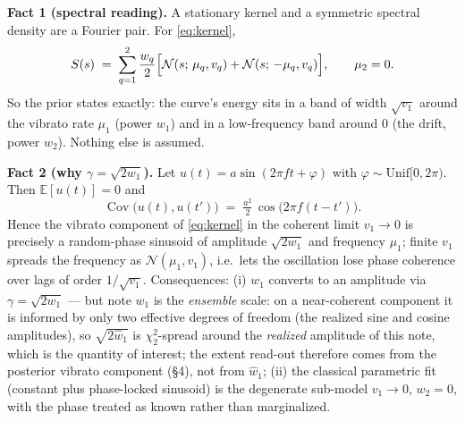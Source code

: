 \documentclass[10pt,a4paper]{article}
\newcommand{\N}{\mathcal{N}}
\begin{document}
\textbf{Fact 1 (spectral reading).}
A stationary kernel and a symmetric spectral density are a Fourier pair.
For \eqref{eq:kernel},
\begin{equation}
S(s) \;=\; \sum_{q=1}^{2} \frac{w_q}{2}
\Bigl[ \N(s;\, \mu_q, v_q) + \N(s;\, -\mu_q, v_q) \Bigr],
\qquad \mu_2 = 0 .
\end{equation}
So the prior states exactly: the curve's energy sits in a band of width
$\sqrt{v_1}$ around the vibrato rate $\mu_1$ (power $w_1$) and in a
low-frequency band around $0$ (the drift, power $w_2$). Nothing else is
assumed.

\textbf{Fact 2 (why $\gamma = \sqrt{2 w_1}$).}
Let $u(t) = a \sin(2\pi f t + \varphi)$ with $\varphi \sim
\mathrm{Unif}[0, 2\pi)$. Then $\mathbb{E}[u(t)] = 0$ and
\begin{equation}
\operatorname{Cov}\bigl(u(t), u(t')\bigr) \;=\; \tfrac{a^2}{2}\,
\cos\bigl(2\pi f (t - t')\bigr).
\end{equation}
Hence the vibrato component of \eqref{eq:kernel} in the coherent limit
$v_1 \to 0$ is precisely a random-phase sinusoid of amplitude
$\sqrt{2 w_1}$ and frequency $\mu_1$; finite $v_1$ spreads the frequency
as $\N(\mu_1, v_1)$, i.e.\ lets the oscillation lose phase coherence over
lags of order $1/\sqrt{v_1}$. Consequences: (i) $w_1$ converts to an
amplitude via $\gamma = \sqrt{2 w_1}$ --- but note $w_1$ is the
\emph{ensemble} scale: on a near-coherent component it is informed by only
two effective degrees of freedom (the realized sine and cosine
amplitudes), so $\sqrt{2\hat w_1}$ is $\chi^2_2$-spread around the
\emph{realized} amplitude of this note, which is the quantity of interest;
the extent read-out therefore comes from the posterior vibrato component
(\S4), not from $\hat w_1$; (ii) the classical parametric fit (constant
plus phase-locked sinusoid) is the degenerate sub-model $v_1 \to 0$,
$w_2 = 0$, with the phase treated as known rather than marginalized.
\end{document}

